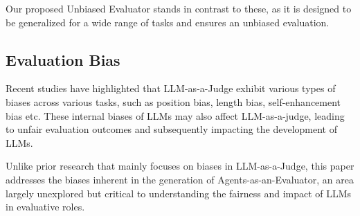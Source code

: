 Our proposed Unbiased Evaluator stands in contrast to these, as it is designed to be generalized for a wide range of tasks and ensures an unbiased evaluation.

\subsection{Evaluation Bias}
Recent studies have highlighted that LLM-as-a-Judge exhibit various types of biases across various tasks\cite{dai2024unifying,gallegos2024bias,chen2402humans,ye2024justice}, such as position bias, length bias, self-enhancement bias etc. These internal biases of LLMs may also affect LLM-as-a-judge, leading to unfair evaluation outcomes and subsequently impacting the development of LLMs. 

Unlike prior research that mainly focuses on biases in LLM-as-a-Judge, this paper addresses the biases inherent in the generation of Agents-as-an-Evaluator, an area largely unexplored but critical to understanding the fairness and impact of LLMs in evaluative roles.